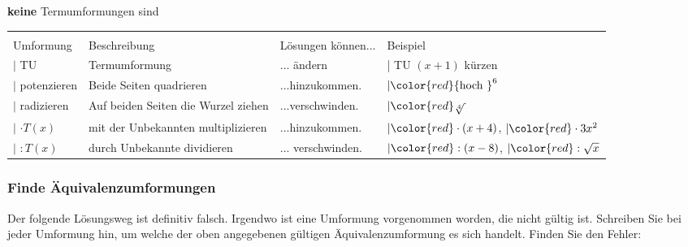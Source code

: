 \textbf{keine} Termumformungen sind

\begin{tabular}{lp{6cm}>{\raggedright}p{4cm}p{4cm}}\hline\\
Umformung  & Beschreibung &Lösungen können... & Beispiel\\\hline
$| $ TU & Termumformung & ... ändern & {| \color{red} TU $(x+1)$ kürzen}\\
$| $ potenzieren  & Beide Seiten quadrieren & ...hinzukommen.&$| \color{red} {\textrm{hoch }}^6$\\
$| $ radizieren & Auf beiden Seiten die Wurzel ziehen& ...verschwinden.&$| \color{red}\sqrt[4]{\,}$\\
$| $ $\cdot{}T(x)$  & mit der Unbekannten multiplizieren & ...hinzukommen.&$| \color{red}\cdot{}(x+4)$, $| \color{red}\cdot{}3x^2$\\
$| $ $:T(x)$  & durch Unbekannte dividieren & ... verschwinden.&$|
\color{red}:(x-8)$, $| \color{red}:\sqrt{x}$\\

\end{tabular}
\newpage

\subsubsection{Finde Äquivalenzumformungen}
Der folgende Lösungsweg ist definitiv falsch. Irgendwo ist eine Umformung vorgenommen worden, die nicht gültig ist.
Schreiben Sie bei jeder Umformung hin, um welche der oben angegebenen gültigen Äquivalenzumformung es sich handelt. Finden Sie den Fehler:

